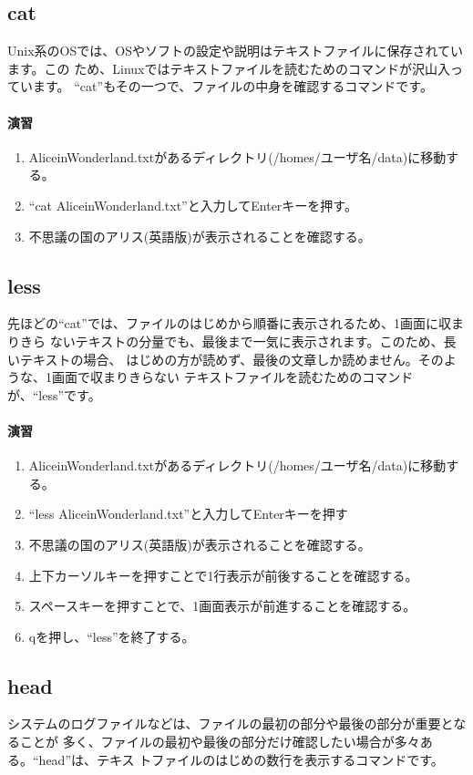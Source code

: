 \subsection{cat}
Unix系のOSでは、OSやソフトの設定や説明はテキストファイルに保存されています。この
ため、Linuxではテキストファイルを読むためのコマンドが沢山入っています。
``cat''もその一つで、ファイルの中身を確認するコマンドです。

\paragraph{演習}
\begin{enumerate}
\item AliceinWonderland.txtがあるディレクトリ(/homes/ユーザ名/data)に移動する。
\item ``cat AliceinWonderland.txt''と入力してEnterキーを押す。
\item 不思議の国のアリス(英語版)が表示されることを確認する。
\end{enumerate}


\subsection{less}
先ほどの``cat''では、ファイルのはじめから順番に表示されるため、1画面に収まりきら
ないテキストの分量でも、最後まで一気に表示されます。このため、長いテキストの場合、
はじめの方が読めず、最後の文章しか読めません。そのような、1画面で収まりきらない
テキストファイルを読むためのコマンドが、``less''です。

\paragraph{演習}
\begin{enumerate}
\item AliceinWonderland.txtがあるディレクトリ(/homes/ユーザ名/data)に移動する。
\item ``less AliceinWonderland.txt''と入力してEnterキーを押す
\item 不思議の国のアリス(英語版)が表示されることを確認する。
\item 上下カーソルキーを押すことで1行表示が前後することを確認する。
\item スペースキーを押すことで、1画面表示が前進することを確認する。
\item qを押し、``less''を終了する。
\end{enumerate}

\subsection{head}
システムのログファイルなどは、ファイルの最初の部分や最後の部分が重要となることが
多く、ファイルの最初や最後の部分だけ確認したい場合が多々ある。``head''は、テキス
トファイルのはじめの数行を表示するコマンドです。

